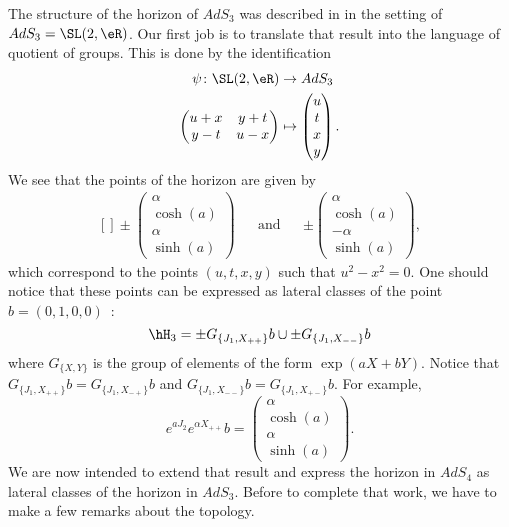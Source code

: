The structure of the horizon of $AdS_3$ was described in \cite{Keio} in the setting of $AdS_3=\SL(2,\eR)$. Our first job is to translate that result into the language of quotient of groups. This is done by the identification
\begin{equation}
	\begin{aligned}
		\psi\colon \SL(2,\eR)&\to AdS_3 \\
		\begin{pmatrix}
			u+x	&	y+t	\\ 
			y-t	&	u-x	
		\end{pmatrix}&\mapsto \begin{pmatrix}
			u	\\ 
			t	\\ 
			x	\\ 
			y	
		\end{pmatrix}.
	\end{aligned}
\end{equation}
We see that the points of the horizon are given by
\begin{equation}			\label{EqHOrAdSTroisVecteur}
	\begin{aligned}[]
		\pm\begin{pmatrix}
			\alpha	\\ 
			\cosh(a)	\\ 
			\alpha	\\ 
			\sinh(a)	
		\end{pmatrix}&&\text{and}&&\pm\begin{pmatrix}
			\alpha	\\ 
			\cosh(a)	\\ 
			-\alpha	\\ 
			\sinh(a)	
		\end{pmatrix},
	\end{aligned}
\end{equation}
which correspond to the points $(u,t,x,y)$ such that $u^2-x^2=0$. One should notice that these points can be expressed as lateral classes of the point $b=(0,1,0,0)$~:
\begin{equation}
	\hH_3=\pm G_{\{ J_1,X_{++} \}}b\cup\pm G_{\{ J_1,X_{--} \}}b
\end{equation}
where $G_{\{ X,Y \}}$ is the group of elements of the form $\exp(aX+bY)$. Notice that $G_{\{ J_1,X_{++} \}}b=G_{\{ J_1,X_{-+} \}}b$ and $G_{\{ J_1,X_{--} \}}b=G_{\{ J_1,X_{+-} \}}b$. For example,
\begin{equation}
	e^{aJ_2} e^{\alpha X_{++}}b=\begin{pmatrix}
		\alpha	\\ 
		\cosh(a)	\\ 
		\alpha	\\ 
		\sinh(a)	
	\end{pmatrix}.
\end{equation}
We are now intended to extend that result and express the horizon in $AdS_4$ as lateral classes of the horizon in $AdS_3$. Before to complete that work, we have to make a few remarks about the topology.

